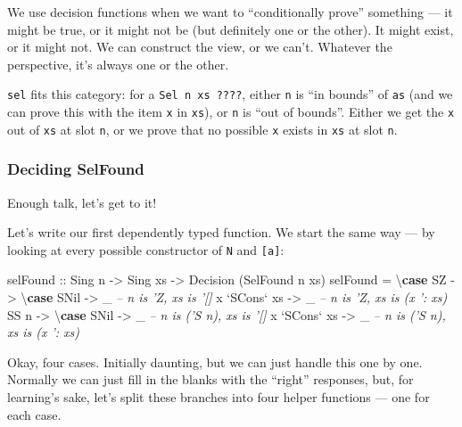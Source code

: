 \documentclass[]{article}
\newenvironment{Shaded}{}{}
\newcommand{\CommentTok}[1]{\textcolor[rgb]{0.38,0.63,0.69}{\textit{#1}}}
\newcommand{\DataTypeTok}[1]{\textcolor[rgb]{0.56,0.13,0.00}{#1}}
\newcommand{\FunctionTok}[1]{\textcolor[rgb]{0.02,0.16,0.49}{#1}}
\newcommand{\KeywordTok}[1]{\textcolor[rgb]{0.00,0.44,0.13}{\textbf{#1}}}
\newcommand{\NormalTok}[1]{#1}
\newcommand{\OtherTok}[1]{\textcolor[rgb]{0.00,0.44,0.13}{#1}}
\begin{document}
We use decision functions when we want to ``conditionally prove'' something ---
it might be true, or it might not be (but definitely one or the other). It might
exist, or it might not. We can construct the view, or we can't. Whatever the
perspective, it's always one or the other.

\texttt{sel} fits this category: for a \texttt{Sel\ n\ xs\ ????}, either
\texttt{n} is ``in bounds'' of \texttt{as} (and we can prove this with the item
\texttt{x} in \texttt{xs}), or \texttt{n} is ``out of bounds''. Either we get
the \texttt{x} out of \texttt{xs} at slot \texttt{n}, or we prove that no
possible \texttt{x} exists in \texttt{xs} at slot \texttt{n}.

\hypertarget{deciding-selfound}{%
\subsubsection{Deciding SelFound}\label{deciding-selfound}}

Enough talk, let's get to it!

Let's write our first dependently typed function. We start the same way --- by
looking at every possible constructor of \texttt{N} and \texttt{{[}a{]}}:

\begin{Shaded}
\begin{Highlighting}[]
\NormalTok{selFound}
\OtherTok{    ::} \DataTypeTok{Sing}\NormalTok{ n}
    \OtherTok{->} \DataTypeTok{Sing}\NormalTok{ xs}
    \OtherTok{->} \DataTypeTok{Decision}\NormalTok{ (}\DataTypeTok{SelFound}\NormalTok{ n xs)}
\NormalTok{selFound }\FunctionTok{=}\NormalTok{ \textbackslash{}}\KeywordTok{case}
    \DataTypeTok{SZ} \OtherTok{->}\NormalTok{ \textbackslash{}}\KeywordTok{case}
      \DataTypeTok{SNil}         \OtherTok{->}\NormalTok{ _   }\CommentTok{-- n is 'Z, xs is '[]}
\NormalTok{      x }\OtherTok{`SCons`}\NormalTok{ xs }\OtherTok{->}\NormalTok{ _   }\CommentTok{-- n is 'Z, xs is (x ': xs)}
    \DataTypeTok{SS}\NormalTok{ n }\OtherTok{->}\NormalTok{ \textbackslash{}}\KeywordTok{case}
      \DataTypeTok{SNil}         \OtherTok{->}\NormalTok{ _   }\CommentTok{-- n is ('S n), xs is '[]}
\NormalTok{      x }\OtherTok{`SCons`}\NormalTok{ xs }\OtherTok{->}\NormalTok{ _   }\CommentTok{-- n is ('S n), xs is (x ': xs)}
\end{Highlighting}
\end{Shaded}

Okay, four cases. Initially daunting, but we can just handle this one by one.
Normally we can just fill in the blanks with the ``right'' responses, but, for
learning's sake, let's split these branches into four helper functions --- one
for each case.
\end{document}
